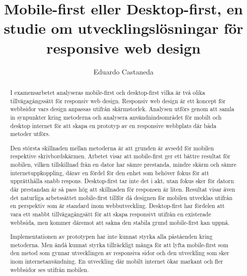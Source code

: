 \documentclass[11pt]{article}
\title{Mobile-first eller Desktop-first, en studie om utvecklingslösningar för responsive web design}
\author{Eduardo Castaneda}
\begin{document}
\maketitle
\thispagestyle{empty}


\newpage

\begin{abstract}

I examensarbetet analyseras mobile-first och desktop-first vilka är två olika tillvägagångssätt för responsiv web design. Responsiv web design är ett koncept för webbsidor vars design anpassas utifrån skärmstorlek. Analysen utförs genom att samla in synpunkter kring metoderna och analysera användnindsområdet för mobilt och desktop internet för att skapa en prototyp av en responsive webbplats där båda metoder utförs.

Den största skillnaden mellan metoderna är att grunden är avsedd för mobilen respektive skrivbordskärmen. Arbetet visar att mobile-first ger ett bättre resultat för mobilen, vilken tillskillnad från en dator har sämre prestanda, mindre skärm och sämre internetuppkoppling,
därav en fördel för den enhet som behöver fokus för att upprätthålla snabb respons. Desktop-first tar inte det i akt, utan fokus sker för datorn där prestandan är så pass hög att skillnaden för responsen är liten. Resultat visar även det naturliga arbetssättet mobile-first tillför då designen för mobilen utvecklas utifrån en perspektiv som är standard inom webbutveckling. Desktop-first har fördelen att vara ett snabbt tillvägagångsätt för att skapa responsivt utifrån en existerade webbsida, men kommer däremot att sakna den stabila grund mobile-first kan uppnå.

Implementationen av prototypen har inte kunnat styrka alla påståenden kring metoderna. Men ändå kunnat styrka tillräckligt många för att lyfta mobile-first som den metod som gynnar utvecklingen av responsiva sidor och den utveckling som sker inom internetanvändning. En utveckling där mobilt internet ökar markant och fler webbsidor ses utifrån mobilen. 



\end{abstract}
\thispagestyle{empty}

\newpage
\tableofcontents
\newpage
\end{document}
